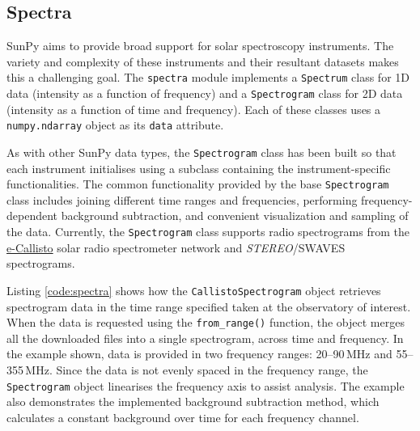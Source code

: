 \subsection{Spectra}\label{sec:spectra}
SunPy aims to provide broad support for solar spectroscopy
instruments.  The variety and complexity of these instruments and
their resultant datasets makes this a challenging goal.  The \texttt{spectra} module implements a
\texttt{Spectrum} class for 1D data (intensity as a function of frequency) and a
\texttt{Spectrogram} class for 2D data (intensity as a function of time and
frequency).  Each of these classes uses a \texttt{numpy.ndarray} object
as its \texttt{data} attribute.  

As with other SunPy data types, the \texttt{Spectrogram} class has been
built so that each instrument initialises using a subclass containing the instrument-specific 
functionalities. The common functionality provided by the base \texttt{Spectrogram} class includes
joining different time ranges and frequencies, performing frequency-dependent background subtraction,
and convenient visualization and sampling of the data.
Currently, the \texttt{Spectrogram} class supports radio spectrograms from the 
\href{http://www.e-callisto.org/}{e-Callisto}
solar radio spectrometer network and \textit{STEREO}/SWAVES spectrograms.

Listing \ref{code:spectra} shows how the \texttt{CallistoSpectrogram}
object retrieves spectrogram data in the time range specified taken at
the observatory of interest.  When the data is requested using the
\texttt{from\_range()} function, the object merges all the downloaded
files into a single spectrogram, across time and frequency.
In the example shown, data is provided in two frequency ranges:
20--90\,MHz and 55--355\,MHz.  Since the data is not evenly spaced in
the frequency range, the \texttt{Spectrogram} object linearises the
frequency axis to assist analysis.  The example also demonstrates
the implemented background subtraction method, which calculates
a constant background over time for each frequency channel.

